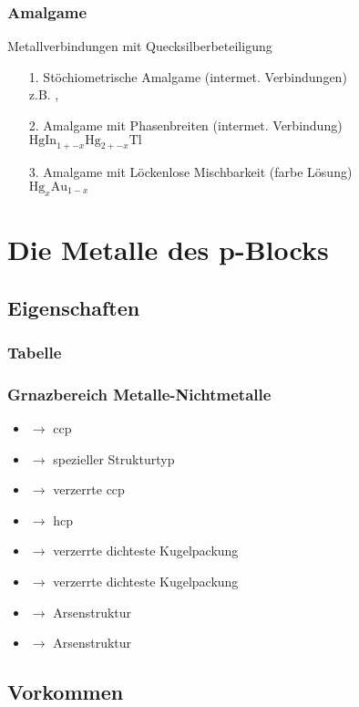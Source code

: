 \documentclass{article}
\begin{document}
\subsubsection{Amalgame}
Metallverbindungen mit Quecksilberbeteiligung
\begin{itemize}
    \item[1.] Stöchiometrische Amalgame (intermet. Verbindungen)\\z.B. , 
    \item[2.] Amalgame mit Phasenbreiten (intermet. Verbindung)\\$\mathrm{HgIn}_{1 +- x} \mathrm{Hg}_{2 +- x}\mathrm{Tl}$
    \item[3.] Amalgame mit Löckenlose Mischbarkeit (farbe Lösung)\\$\mathrm{Hg}_x\mathrm{Au}_{1-x}$
\end{itemize}

\section{Die Metalle des p-Blocks}
\subsection{Eigenschaften}
\subsubsection{Tabelle}
\subsubsection{Grnazbereich Metalle-Nichtmetalle}
\begin{itemize}
    \item {} $\rightarrow$ ccp
    \item {} $\rightarrow$ spezieller Strukturtyp
    \item {} $\rightarrow$ verzerrte ccp
    \item {} $\rightarrow$ hcp
    \item {} $\rightarrow$ verzerrte dichteste Kugelpackung
    \item {} $\rightarrow$ verzerrte dichteste Kugelpackung
    \item {} $\rightarrow$ Arsenstruktur
    \item {} $\rightarrow$ Arsenstruktur
\end{itemize}
\subsection{Vorkommen}
\end{document}
